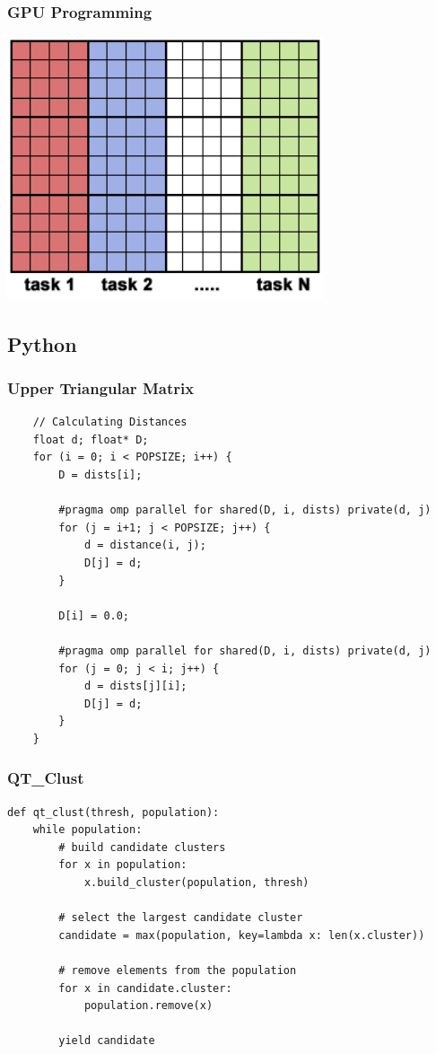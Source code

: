 \documentclass[t]{beamer}
\begin{document}
\begin{frame}
\frametitle{GPU Programming}
\begin{center}
  \includegraphics[width=0.7\textwidth]{img/array.png} 
\end{center}
\end{frame}

\subsection{Python}
\begin{frame}[fragile]
\frametitle{Upper Triangular Matrix}
\begin{verbatim}
    // Calculating Distances
    float d; float* D;
    for (i = 0; i < POPSIZE; i++) {
        D = dists[i];

        #pragma omp parallel for shared(D, i, dists) private(d, j)
        for (j = i+1; j < POPSIZE; j++) {
            d = distance(i, j);
            D[j] = d;
        }
        
        D[i] = 0.0;
        
        #pragma omp parallel for shared(D, i, dists) private(d, j)
        for (j = 0; j < i; j++) {
            d = dists[j][i];
            D[j] = d;
        }
    }
\end{verbatim}
\end{frame}

\begin{frame}[fragile]
\frametitle{QT\_Clust}
\begin{verbatim}
def qt_clust(thresh, population):
    while population:
        # build candidate clusters
        for x in population:
            x.build_cluster(population, thresh)
    
        # select the largest candidate cluster
        candidate = max(population, key=lambda x: len(x.cluster))
  
        # remove elements from the population
        for x in candidate.cluster:
            population.remove(x)
    
        yield candidate
\end{verbatim}
\end{frame}
\end{document}

